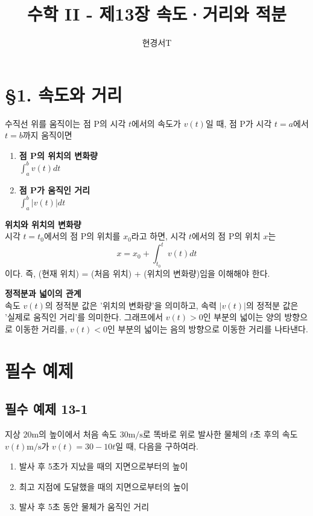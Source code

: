 \documentclass[a4paper,11pt]{article}
\title{\textbf{수학 II - 제13장 속도·거리와 적분}}
\author{현경서T}
\date{}
\begin{document}
\maketitle

\section*{§1. 속도와 거리}

\begin{conceptbox}[기본 정석]
수직선 위를 움직이는 점 P의 시각 $t$에서의 속도가 $v(t)$일 때, 점 P가 시각 $t=a$에서 $t=b$까지 움직이면
\begin{enumerate}
    \item \textbf{점 P의 위치의 변화량} \\
    $\displaystyle \int_{a}^{b} v(t) dt$
    \item \textbf{점 P가 움직인 거리} \\
    $\displaystyle \int_{a}^{b} |v(t)| dt$
\end{enumerate}
\end{conceptbox}

\begin{advicebox}
\textbf{위치와 위치의 변화량} \\
시각 $t=t_0$에서의 점 P의 위치를 $x_0$라고 하면, 시각 $t$에서의 점 P의 위치 $x$는
\[ x = x_0 + \int_{t_0}^{t} v(t) dt \]
이다. 즉, (현재 위치) = (처음 위치) + (위치의 변화량)임을 이해해야 한다.
\end{advicebox}

\begin{advicebox}
\textbf{정적분과 넓이의 관계} \\
속도 $v(t)$의 정적분 값은 '위치의 변화량'을 의미하고, 속력 $|v(t)|$의 정적분 값은 '실제로 움직인 거리'를 의미한다. 그래프에서 $v(t) > 0$인 부분의 넓이는 양의 방향으로 이동한 거리를, $v(t) < 0$인 부분의 넓이는 음의 방향으로 이동한 거리를 나타낸다.
\end{advicebox}

\newpage

\section*{필수 예제}

\subsection*{필수 예제 13-1}
지상 $20\text{m}$의 높이에서 처음 속도 $30\text{m/s}$로 똑바로 위로 발사한 물체의 $t$초 후의 속도 $v(t)\text{m/s}$가 $v(t)=30-10t$일 때, 다음을 구하여라.
\begin{enumerate}[label=(\arabic*)]
    \item 발사 후 5초가 지났을 때의 지면으로부터의 높이
    \item 최고 지점에 도달했을 때의 지면으로부터의 높이
    \item 발사 후 5초 동안 물체가 움직인 거리
\end{enumerate}
\end{document}
